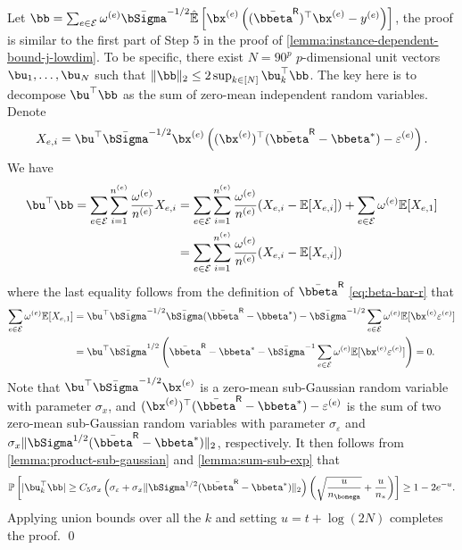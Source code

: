 \documentclass[10pt]{article}
\numberwithin{equation}{section}
\begin{document}

Let $\bb = \sum_{e\in \mathcal{E}} \omega^{(e)} \bar{\bSigma}^{-1/2} \hat{\mathbb{E}} \left[\bx^{(e)} \left((\bar{\bbeta}^{\mathsf{R}})^\top \bx^{(e)} - y^{(e)}\right)\right]$, the proof is similar to the first part of {\sc Step 5} in the proof of \cref{lemma:instance-dependent-bound-j-lowdim}. To be specific, there exist $N=90^p$ $p$-dimensional unit vectors $\bu_1,\ldots, \bu_N$ such that $\|\bb\|_2 \le 2\sup_{k\in [N]} \bu_k^\top \bb$. The key here is to decompose $\bu^\top \bb$ as the sum of zero-mean independent random variables. Denote
\begin{align*}
    X_{e,i} = \bu^\top \bar{\bSigma}^{-1/2} \bx^{(e)} \left((\bx^{(e)})^\top (\bar{\bbeta}^{\mathsf{R}} - \bbeta^*) - \varepsilon^{(e)}\right).
\end{align*} We have
\begin{align*}
    \bu^\top \bb = \sum_{e\in \mathcal{E}} \sum_{i=1}^{n^{(e)}} \frac{\omega^{(e)}}{n^{(e)}} X_{e,i} &= \sum_{e\in \mathcal{E}} \sum_{i=1}^{n^{(e)}} \frac{\omega^{(e)}}{n^{(e)}} (X_{e,i} - \mathbb{E}[X_{e,i}]) + \sum_{e\in \mathcal{E}} \omega^{(e)} \mathbb{E}[X_{e,1}] \\ &= \sum_{e\in \mathcal{E}} \sum_{i=1}^{n^{(e)}} \frac{\omega^{(e)}}{n^{(e)}} (X_{e,i} - \mathbb{E}[X_{e,i}])
\end{align*} where the last equality follows from the definition of $\bar{\bbeta}^{\mathsf{R}}$ \eqref{eq:beta-bar-r} that
\begin{align*}
    \sum_{e\in \mathcal{E}} \omega^{(e)} \mathbb{E}[X_{e,1}] &= \bu^\top \bar{\bSigma}^{-1/2} \bar{\bSigma} (\bar{\bbeta}^{\mathsf{R}} - \bbeta^*) - \bar{\bSigma}^{-1/2} \sum_{e\in \mathcal{E}} \omega^{(e)} \mathbb{E} [\bx^{(e)} \varepsilon^{(e)}] \\
    &= \bu^\top \bar{\bSigma}^{1/2} \left(\bar{\bbeta}^{\mathsf{R}} - \bbeta^* - \bar{\bSigma}^{-1} \sum_{e\in \mathcal{E}} \omega^{(e)} \mathbb{E} [\bx^{(e)} \varepsilon^{(e)}] \right) = 0.
\end{align*} Note that $\bu^\top \bar{\bSigma}^{-1/2} \bx^{(e)}$ is a zero-mean sub-Gaussian random variable with parameter $\sigma_x$, and $(\bx^{(e)})^\top (\bar{\bbeta}^{\mathsf{R}} - \bbeta^*) - \varepsilon^{(e)}$ is the sum of two zero-mean sub-Gaussian random variables with parameter $\sigma_\varepsilon$ and $\sigma_x \|\bSigma^{1/2}(\bar{\bbeta}^{\mathsf{R}}-\bbeta^*)\|_2$, respectively. It then follows from \cref{lemma:product-sub-gaussian} and \ref{lemma:sum-sub-exp} that
\begin{align*}
    \mathbb{P}\left[ |\bu_k^\top \bb| \ge C_5\sigma_x \left(\sigma_{\varepsilon} + \sigma_x \|\bSigma^{1/2}(\bar{\bbeta}^{\mathsf{R}}-\bbeta^*)\|_2\right) \left(\sqrt{\frac{u}{n_{\bomega}}} + \frac{u}{n_*}\right)\right] \ge 1-2e^{-u}.
\end{align*} Applying union bounds over all the $k$ and setting $u=t+\log(2N)$ completes the proof. \qed
\end{document}
